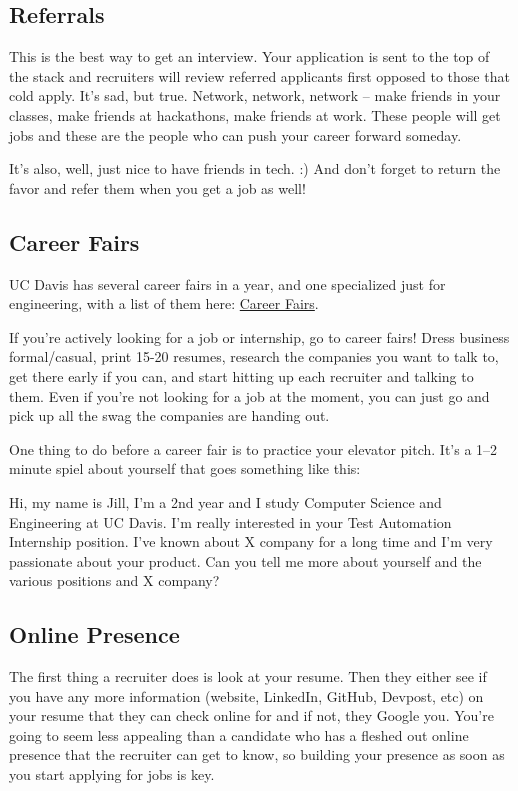 \documentclass{article}
\begin{document}
\subsection {Referrals}
\label{sec:referrals}
This is the best way to get an interview. Your application is sent to the top of
the stack and recruiters will review referred applicants first opposed to those
that cold apply. It's sad, but true. Network, network, network -- make friends
in your classes, make friends at hackathons, make friends at work. These people
will get jobs and these are the people who can push your career forward
someday.

It's also, well, just nice to have friends in tech. :) And don't forget to
return the favor and refer them when you get a job as well!

\subsection{Career Fairs}
\label{sec:careerfair}
UC Davis has several career fairs in a year, and one specialized just for
engineering, with a list of them here:
\href{https://icc.ucdavis.edu/employer/fairs.htm}{Career Fairs}.

If you're actively looking for a job or internship, go to career fairs! Dress
business formal/casual, print 15-20 resumes, research the companies you want to
talk to, get there early if you can, and start hitting up each recruiter and
talking to them. Even if you're not looking for a job at the moment, you can
just go and pick up all the swag the companies are handing out.

One thing to do before a career fair is to practice your elevator pitch. It's a
1--2 minute spiel about yourself that goes something like this:

\begin{displayquote}
Hi, my name is Jill, I'm a 2nd year and I study Computer Science and Engineering
at UC Davis. I'm really interested in your Test Automation Internship
position. I've known about X company for a long time and I'm very passionate
about your product. Can you tell me more about yourself and the various
positions and X company?
\end{displayquote}

\subsection {Online Presence}
\label{sec:onlinepresence}
The first thing a recruiter does is look at your resume. Then they either see if
you have any more information (website, LinkedIn, GitHub, Devpost, etc) on your
resume that they can check online for and if not, they Google you. You're going
to seem less appealing than a candidate who has a fleshed out online presence
that the recruiter can get to know, so building your presence as soon as you
start applying for jobs is key.
\end{document}
